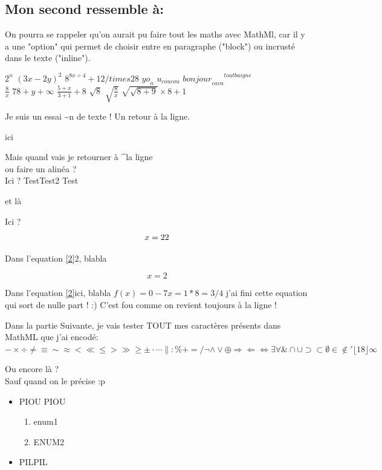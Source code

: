 \documentclass[10pt,a4paper]{report}
\begin{document}
\subsection{Mon second ressemble à:}


On pourra se rappeler qu'on aurait pu faire tout les maths avec MathMl, car il y a une "option" qui permet de choisir entre en paragraphe ("block") ou incrusté dans le texte ("inline").

$ 2^n $
$ (3x - 2y)^2 $
$ 8^{8x \div 4} + 12 /times 28 $
$ {yo}_n $
$ u_{coucou} $
$ {{bonjour}_{ca va}}^{tout baigne} $
\\
$ \frac{8}{x} $
$ 78+y+\infty $
$ \frac{5+x}{3+1} + 8 $
$ \sqrt{8}$
$ \sqrt{\frac{8}{x}}$
$ \sqrt{\sqrt{8+9}} \times 8 +1 $

Je suis un essai \textasciitilde n de texte !
Un retour à la ligne.

\jambonGros

\label{label1}{ici}

Mais quand vais je retourner à \textasciicircum la ligne\\ ou faire un alinéa ?\\
Ici ? Test\newline Test2
Test

\label{label2}{et là}

Ici ?
\begin{equation}
x = 2 \label*{2}
\end{equation}

Dans l'equation \ref{2}{2}, blabla


\begin{equation*}
x = 2
\end{equation*}

Dans l'equation \ref{2}{ici}, blabla \(f(x) = 0 -7x = 1 * 8 = 3 /4 \) j'ai fini cette equation qui sort de nulle part ! :)  C'est fou comme on revient toujours à la ligne !

Dans la partie Suivante, je vais tester TOUT mes caractères présents dans MathML que j'ai encodé: \( - \times \div \neq \equiv \sim \approx < \ll \leq > \gg \geq \pm \cdot \cdots \| : \% + = /
 \neg \wedge \vee \oplus \Rightarrow \Leftarrow \Leftrightarrow \exists \forall \&
\cap \cup \supset \subset \emptyset \in \notin
\prime \lfloor 18 \rfloor \infty
\)

Ou encore là ? \\Sauf quand on le précise :p

\begin{itemize}
\item PIOU PIOU
\begin{enumerate}
\item enum1
\item ENUM2
\end{enumerate}
\item PILPIL
\end{itemize}
\end{document}
